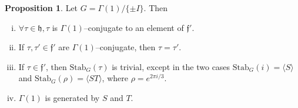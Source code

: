 \documentclass{article}
\theoremstyle{definition}
\newtheorem{prop}[theorem]{Proposition}
\begin{document}
\begin{prop}
    Let $G = \Gamma(1)/\{\pm I\}$. Then
    \begin{enumerate}[(i)]
        \item $\forall \tau \in \mathfrak{h}, \tau$ is $\Gamma(1)$--conjugate to an element of $\mathfrak{f}'$.
        \item If $\tau, \tau' \in \mathfrak{f}'$ are $\Gamma(1)$--conjugate, then $\tau = \tau'$.
        \item If $\tau \in \mathfrak{f'}$, then $\text{Stab}_G(\tau)$ is trivial, except in the two cases $\text{Stab}_G(i) = \langle S \rangle$ and $\text{Stab}_G(\rho) = \langle ST \rangle$, where $\rho = e^{2\pi i / 3}$.
        \item $\Gamma(1)$ is generated by $S$ and $T$.
    \end{enumerate}
\end{prop}
\end{document}
